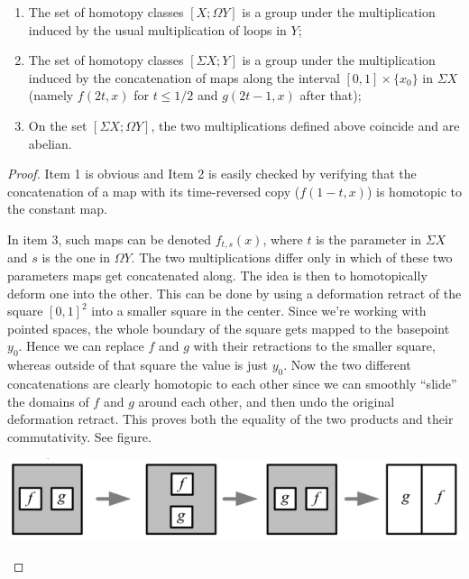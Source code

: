 \begin{prop}\label{suspension maps prop}
    \begin{enumerate}
        \item The set of homotopy classes $[X;\Omega Y]$ is a group under the multiplication induced by the usual multiplication of loops in $Y$;
        \item The set of homotopy classes $[\Sigma X;Y]$ is a group under the multiplication induced by the concatenation of maps along the interval $[0,1]\times\{x_0\}$ in $\Sigma X$ (namely $f(2t,x)$ for $t\leq 1/2$ and $g(2t-1,x)$ after that);
        \item On the set $[\Sigma X;\Omega Y]$, the two multiplications defined above coincide and are abelian.
    \end{enumerate}
\end{prop}
\begin{proof}
    Item 1 is obvious and Item 2 is easily checked by verifying that the concatenation of a map with its time-reversed copy ($f(1-t,x)$) is homotopic to the constant map.

    In item 3, such maps can be denoted $f_{t,s}(x)$, where $t$ is the parameter in $\Sigma X$ and $s$ is the one in $\Omega Y$. The two multiplications differ only in which of these two parameters maps get concatenated along. The idea is then to homotopically deform one into the other. This can be done by using a deformation retract of the square $[0,1]^2$ into a smaller square in the center.  Since we're working with pointed spaces, the whole boundary of the square gets mapped to the basepoint $y_0$. Hence we can replace $f$ and $g$ with their retractions to the smaller square, whereas outside of that square the value is just $y_0$. Now the two different concatenations are clearly homotopic to each other since we can smoothly ``slide'' the domains of $f$ and $g$ around each other, and then undo the original deformation retract. This proves both the equality of the two products and their commutativity. See figure.
    \begin{center}
    \includegraphics[scale=1]{figures/higher-homotopy.png}
    \end{center}
\end{proof}

